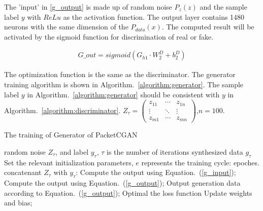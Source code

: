 \documentclass[conference]{IEEEtran}
\begin{document}
The 'input' in \eqref{g_output} is made up of random noise $P_z(z)$ and the sample label $y$ with $ReLu$ as the activation function. The output layer contains 1480 neurons with the same dimension of the $P_{data}(x)$. The computed result will be activated by the sigmoid function for discrimination of real or fake.

\begin{equation}
\begin{split}
\label{g_output}
G\_out=sigmoid(G_{h1}\cdot W^D_2+b^D_2)
\end{split}
\end{equation}

The optimization function is the same as the discriminator. The generator training algorithm is shown in Algorithm.~\ref{algorithm:generator}. The sample label $y$ in Algorithm.~\ref{algorithm:generator} should be consistent with $y$ in Algorithm.~\ref{algorithm:discriminator}.
$Z_{\tau}=\begin{pmatrix}
z_{11}&\cdots&z_{1n}\\
\vdots&\ddots&\vdots\\
z_{m1}&\cdots&z_{mn}
\end{pmatrix}$,$n=100$.

\begin{algorithm}[htbp]
	\caption{The training of Generator of PacketCGAN}  \label{algorithm:generator}
	\begin{algorithmic}[1]  
		\REQUIRE random noise $Z_{\tau}$, and label $y_{\tau}$, $\tau$ is the number of iterations
		\ENSURE synthesized data $g_{\tau}$
		\STATE Set the relevant initialization parameters, $e$ represents the training cycle: epoches.
		\STATE concatenant $Z_\tau$ with $y_\tau$: 
		\STATE Compute the output using Equation.~(\ref{g_input});
		\STATE Compute the output using Equation.~(\ref{g_output});
		\STATE Output generation data according to Equation.~(\ref{g_output});
		\STATE Optimal the loss function
		\STATE Update weights and bias;
		\ENDFOR \\ %
		\ENDFOR \\ %
	\end{algorithmic}  
\end{algorithm}  
\end{document}
